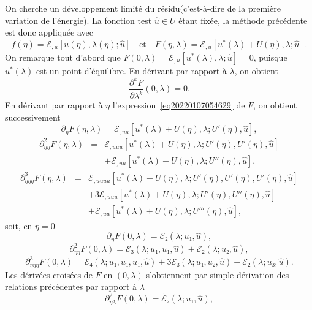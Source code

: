 \documentclass[12pt, final]{amsart}
\theoremstyle{definition}
\begin{document}
On cherche un développement limité du résidu(c'est-à-dire de la première variation de l'énergie). La fonction test \(\hat{u}∈U\) étant fixée, la méthode précédente est donc appliquée avec
\begin{equation}
 \label{eq20220107054629} f(η) =ℰ_{, u} [u(η), λ
 (η) ; \hat{u}] \quad \text{et} \quad F(η, λ) =ℰ_{, u}
 [u^{\ast}(λ) + U(η), λ ; \hat{u}] .
\end{equation}
On remarque tout d'abord que \(F(0, λ) =ℰ_{, u} [u^{\ast}
(λ), λ ; \hat{u}] = 0\), puisque \(u^{\ast}(λ)\) est un point
d'équilibre. En dérivant par rapport à \(λ\), on obtient
\begin{equation}
 \label{eq20211112164240} \frac{\partial^k F}{\partial λ^k}(0,
 λ) = 0.
\end{equation}
En dérivant par rapport à \(η\) l'expression~\eqref{eq20220107054629} de \(F\), on obtient successivement
\begin{equation}
 \partial_{η} F(η, λ) =ℰ_{, u u} [u^{\ast}
 (λ) + U(η), λ ; U'(η), \hat{u}],
\end{equation}
\begin{eqnarray}
 \partial_{η η}^2 F(η, λ) & = & ℰ_{, u
  u u} [u^{\ast}(λ) + U(η), λ ; U'(η),
 U'(η), \hat{u}] \nonumber\\
 & & +ℰ_{, u u} [u^{\ast}(λ) + U
 (η), λ ; U''(η), \hat{u}],
\end{eqnarray}
\begin{eqnarray}
 \partial_{η η η}^3 F(η, λ) & = &
 ℰ_{, u u u u} [u^{\ast}(λ) + U
 (η), λ ; U'(η), U'(η), U'(η), \hat{u}] \nonumber\\
 & & + 3ℰ_{, u u u} [u^{\ast}
 (λ) + U(η), λ ; U'(η), U''(η), \hat{u}] \nonumber\\
 & & +ℰ_{, u u} [u^{\ast}(λ) + U
 (η), λ ; U'''(η), \hat{u}],
\end{eqnarray}
soit, en \(η = 0\)
\begin{equation}
 \partial_{η} F(0, λ) =ℰ₂(λ ; u₁, \hat{u}),
\end{equation}
\begin{equation}
 \partial_{η η}^2 F(0, λ) =ℰ₃(λ ;
 u₁, u₁, \hat{u}) +ℰ₂(λ ; u₂, \hat{u}),
\end{equation}
\begin{equation}
 \partial_{η η η}^3 F(0, λ) =ℰ₄
 (λ ; u₁, u₁, u₁, \hat{u}) + 3ℰ₃(λ ; u₁, u₂,
 \hat{u}) +ℰ₂(λ ; u₃, \hat{u}) .
\end{equation}
Les dérivées croisées de \(F\) en \((0, λ)\) s'obtiennent par simple dérivation des relations précédentes par rapport à \(λ\)
\begin{equation}
 \partial_{η λ}^2 F(0, λ) = \dot{ℰ₂}
 (λ ; u₁, \hat{u}),
\end{equation}
\end{document}
